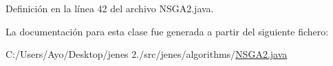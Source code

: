 Definición en la línea 42 del archivo N\-S\-G\-A2.\-java.



La documentación para esta clase fue generada a partir del siguiente fichero\-:\begin{DoxyCompactItemize}
\item 
C\-:/\-Users/\-Ayo/\-Desktop/jenes 2./src/jenes/algorithms/\hyperlink{_n_s_g_a2_8java}{N\-S\-G\-A2.\-java}\end{DoxyCompactItemize}
